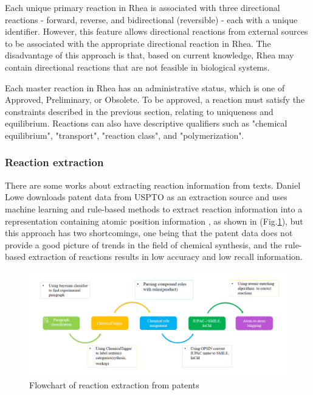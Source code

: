 \documentclass[%
 aip,
 jmp,%
 amsmath,amssymb,
 reprint,%
]{revtex4-2}
\begin{document}
Each unique primary reaction in Rhea is associated with three directional reactions - forward, reverse, and bidirectional (reversible) - each with a unique identifier. However, this feature allows directional reactions from external sources to be associated with the appropriate directional reaction in Rhea. The disadvantage of this approach is that, based on current knowledge, Rhea may contain directional reactions that are not feasible in biological systems.

Each master reaction in Rhea has an administrative status, which is one of Approved, Preliminary, or Obsolete. To be approved, a reaction must satisfy the constraints described in the previous section, relating to uniqueness and equilibrium. Reactions can also have descriptive qualifiers such as "chemical equilibrium", "transport", "reaction class", and "polymerization".

\subsubsection{Reaction extraction}

There are some works about extracting reaction information from texts. Daniel Lowe downloads patent data from USPTO as an extraction source and uses machine learning and rule-based methods to extract reaction information into a representation containing atomic position information \cite{lowe2012extraction}, as shown in (Fig.\ref{ Fig.5 }), but this approach has two shortcomings, one being that the patent data does not provide a good picture of trends in the field of chemical synthesis, and the rule-based extraction of reactions results in low accuracy and low recall information.

\begin{figure}[htbp]
 \centering
 \includegraphics[width=1\textwidth]{figure/5.png}
 \caption{ Flowchart of reaction extraction from patents }
 \label{ Fig.5 }
\end{figure}
\end{document}
